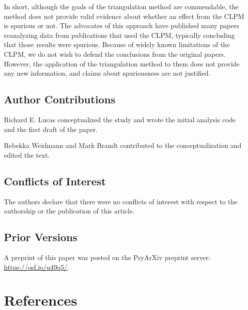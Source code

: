 \documentclass[
  man,mask,floatsintext]{apa6}
\begin{document}
In short, although the goals of the triangulation method are commendable, the method does not provide valid evidence about whether an effect from the CLPM is spurious or not. The advocates of this approach have published many papers reanalyzing data from publications that used the CLPM, typically concluding that those results were spurious. Because of widely known limitations of the CLPM, we do not wish to defend the conclusions from the original papers. However, the application of the triangulation method to them does not provide any new information, and claims about spuriousness are not justified.

\subsection{Author Contributions}\label{author-contributions}

Richard E. Lucas conceptualized the study and wrote the initial analysis code and the first draft of the paper.

Rebekka Weidmann and Mark Brandt contributed to the conceptualization and edited the text.

\subsection{Conflicts of Interest}\label{conflicts-of-interest}

The authors declare that there were no conflicts of interest with respect to the authorship or the publication of this article.

\subsection{Prior Versions}\label{prior-versions}

A preprint of this paper was posted on the PsyArXiv preprint server: \url{https://osf.io/u49q5/}.

\newpage

\section*{References}\label{references}
\end{document}
